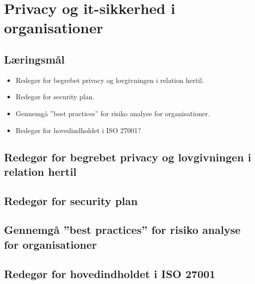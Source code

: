 \section{Privacy og it-sikkerhed i organisationer}

\subsection{Læringsmål}

\begin{itemize}
	\item Redegør for begrebet privacy og lovgivningen i relation hertil.
	\item Redegør for security plan.
	\item Gennemgå ''best practices'' for risiko analyse for organisationer.
	\item Redegør for hovedindholdet i ISO 27001?
\end{itemize}

\subsection{Redegør for begrebet privacy og lovgivningen i relation hertil}
\subsection{Redegør for security plan}
\subsection{Gennemgå ''best practices'' for risiko analyse for organisationer}
\subsection{Redegør for hovedindholdet i ISO 27001}
